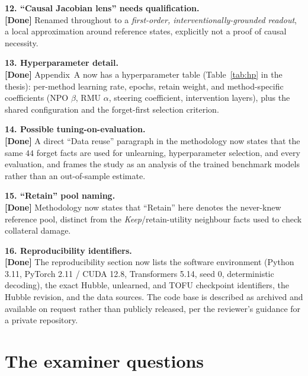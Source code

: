 \documentclass[11pt,a4paper]{article}
\newcommand{\done}{\textbf{\textcolor{black!80}{[Done]}}}
\newcommand{\issue}[1]{\medskip\noindent\textbf{#1}\\}
\begin{document}
\issue{12. ``Causal Jacobian lens'' needs qualification.}
\done{} Renamed throughout to a \emph{first-order, interventionally-grounded readout}, a local
approximation around reference states, explicitly not a proof of causal necessity.

\issue{13. Hyperparameter detail.}
\done{} Appendix~A now has a hyperparameter table (Table~\ref{tab:hp} in the thesis): per-method learning
rate, epochs, retain weight, and method-specific coefficients (NPO $\beta$, RMU $\alpha$, steering
coefficient, intervention layers), plus the shared configuration and the forget-first selection criterion.

\issue{14. Possible tuning-on-evaluation.}
\done{} A direct ``Data reuse'' paragraph in the methodology now states that the same $44$ forget facts are
used for unlearning, hyperparameter selection, and every evaluation, and frames the study as an analysis of
the trained benchmark models rather than an out-of-sample estimate.

\issue{15. ``Retain'' pool naming.}
\done{} Methodology now states that ``Retain'' here denotes the never-knew reference pool, distinct from the
\emph{Keep}/retain-utility neighbour facts used to check collateral damage.

\issue{16. Reproducibility identifiers.}
\done{} The reproducibility section now lists the software environment (Python 3.11, PyTorch 2.11 / CUDA
12.8, Transformers 5.14, seed 0, deterministic decoding), the exact Hubble, unlearned, and TOFU checkpoint
identifiers, the Hubble revision, and the data sources. The code base is described as archived and
available on request rather than publicly released, per the reviewer's guidance for a private repository.

\section{The examiner questions}
\end{document}
